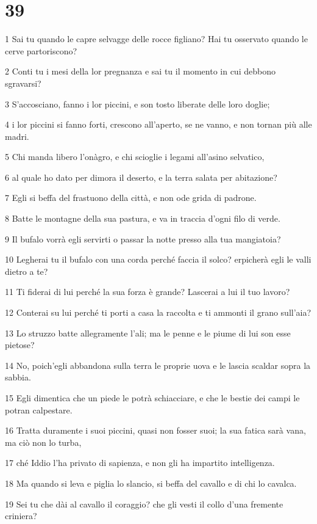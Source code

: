 \chapter{39}

\par 1 Sai tu quando le capre selvagge delle rocce figliano? Hai tu osservato quando le cerve partoriscono?
\par 2 Conti tu i mesi della lor pregnanza e sai tu il momento in cui debbono sgravarsi?
\par 3 S'accosciano, fanno i lor piccini, e son tosto liberate delle loro doglie;
\par 4 i lor piccini si fanno forti, crescono all'aperto, se ne vanno, e non tornan più alle madri.
\par 5 Chi manda libero l'onàgro, e chi scioglie i legami all'asino selvatico,
\par 6 al quale ho dato per dimora il deserto, e la terra salata per abitazione?
\par 7 Egli si beffa del frastuono della città, e non ode grida di padrone.
\par 8 Batte le montagne della sua pastura, e va in traccia d'ogni filo di verde.
\par 9 Il bufalo vorrà egli servirti o passar la notte presso alla tua mangiatoia?
\par 10 Legherai tu il bufalo con una corda perché faccia il solco? erpicherà egli le valli dietro a te?
\par 11 Ti fiderai di lui perché la sua forza è grande? Lascerai a lui il tuo lavoro?
\par 12 Conterai su lui perché ti porti a casa la raccolta e ti ammonti il grano sull'aia?
\par 13 Lo struzzo batte allegramente l'ali; ma le penne e le piume di lui son esse pietose?
\par 14 No, poich'egli abbandona sulla terra le proprie uova e le lascia scaldar sopra la sabbia.
\par 15 Egli dimentica che un piede le potrà schiacciare, e che le bestie dei campi le potran calpestare.
\par 16 Tratta duramente i suoi piccini, quasi non fosser suoi; la sua fatica sarà vana, ma ciò non lo turba,
\par 17 ché Iddio l'ha privato di sapienza, e non gli ha impartito intelligenza.
\par 18 Ma quando si leva e piglia lo slancio, si beffa del cavallo e di chi lo cavalca.
\par 19 Sei tu che dài al cavallo il coraggio? che gli vesti il collo d'una fremente criniera?
